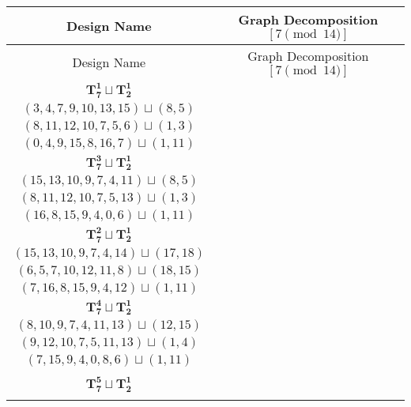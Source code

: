 \documentclass{article}
\begin{document}
    \begin{longtable}{|c|c|}
        \hline
        Design Name & Graph Decomposition $[7\pmod{14}]$ \\
        \hline
        \endfirsthead
        \hline
        Design Name & Graph Decomposition $[7\pmod{14}]$ \\
        \hline
        \endhead
        $\mathbf{T_{7}^{1}} \sqcup \mathbf{T_{2}^{1}}$ & \begin{tabular}{c}
        $(0,1,2,4,6,9,12)\sqcup(13,14)$ \\ 
        $(3,4,7,9,10,13,15)\sqcup(8,5)$ \\ 
        $(8,11,12,10,7,5,6)\sqcup(1,3)$ \\ 
        $(0,4,9,15,8,16,7)\sqcup(1,11)$
        \end{tabular} \\ 
        \hline
        $\mathbf{T_{7}^{3}} \sqcup \mathbf{T_{2}^{1}}$ & \begin{tabular}{c}
        $(12,9,6,4,2,1,7)\sqcup(14,15)$ \\ 
        $(15,13,10,9,7,4,11)\sqcup(8,5)$ \\ 
        $(8,11,12,10,7,5,13)\sqcup(1,3)$ \\ 
        $(16,8,15,9,4,0,6)\sqcup(1,11)$
        \end{tabular} \\ 
        \hline
        $\mathbf{T_{7}^{2}} \sqcup \mathbf{T_{2}^{1}}$ & \begin{tabular}{c}
        $(0,1,2,4,6,9,3)\sqcup(16,19)$ \\ 
        $(15,13,10,9,7,4,14)\sqcup(17,18)$ \\ 
        $(6,5,7,10,12,11,8)\sqcup(18,15)$ \\ 
        $(7,16,8,15,9,4,12)\sqcup(1,11)$
        \end{tabular} \\ 
        \hline
        $\mathbf{T_{7}^{4}} \sqcup \mathbf{T_{2}^{1}}$ & \begin{tabular}{c}
        $(8,6,4,2,1,9,7)\sqcup(14,15)$ \\ 
        $(8,10,9,7,4,11,13)\sqcup(12,15)$ \\ 
        $(9,12,10,7,5,11,13)\sqcup(1,4)$ \\ 
        $(7,15,9,4,0,8,6)\sqcup(1,11)$
        \end{tabular} \\ 
        \hline
        $\mathbf{T_{7}^{5}} \sqcup \mathbf{T_{2}^{1}}$ & \begin{tabular}{c}

\end{tabular}
\end{longtable}
\end{document}
